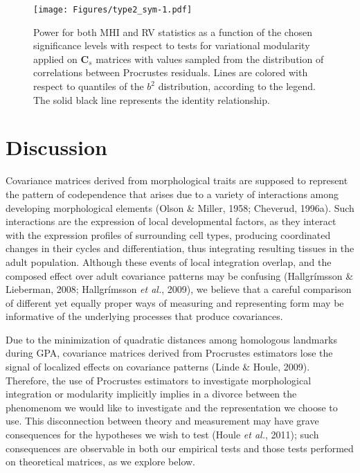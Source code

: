 \documentclass[12pt,twoside]{report}
\begin{document}
\begin{figure}[htbp]
\centering
\texttt{[image: Figures/type2\_sym-1.pdf]}
\caption{Power for both MHI and RV statistics as a function of the
chosen significance levels with respect to tests for variational
modularity applied on $\mathbf{C}_s$ matrices with values sampled from
the distribution of correlations between Procrustes residuals. Lines are
colored with respect to quantiles of the $b^2$ distribution, according
to the legend. The solid black line represents the identity
relationship. \label{fig:type2_sym}}
\end{figure}

\section{Discussion}\label{discussion}

Covariance matrices derived from morphological traits are supposed to
represent the pattern of codependence that arises due to a variety of
interactions among developing morphological elements (Olson \& Miller,
1958; Cheverud, 1996a). Such interactions are the expression of local
developmental factors, as they interact with the expression profiles of
surrounding cell types, producing coordinated changes in their cycles
and differentiation, thus integrating resulting tissues in the adult
population. Although these events of local integration overlap, and the
composed effect over adult covariance patterns may be confusing
(Hallgrímsson \& Lieberman, 2008; Hallgrímsson \emph{et al.}, 2009), we
believe that a careful comparison of different yet equally proper ways
of measuring and representing form may be informative of the underlying
processes that produce covariances.

Due to the minimization of quadratic distances among homologous
landmarks during GPA, covariance matrices derived from Procrustes
estimators lose the signal of localized effects on covariance patterns
(Linde \& Houle, 2009). Therefore, the use of Procrustes estimators to
investigate morphological integration or modularity implicitly implies
in a divorce between the phenomenom we would like to investigate and the
representation we choose to use. This disconnection between theory and
measurement may have grave consequences for the hypotheses we wish to
test (Houle \emph{et al.}, 2011); such consequences are observable in
both our empirical tests and those tests performed on theoretical
matrices, as we explore below.
\end{document}
